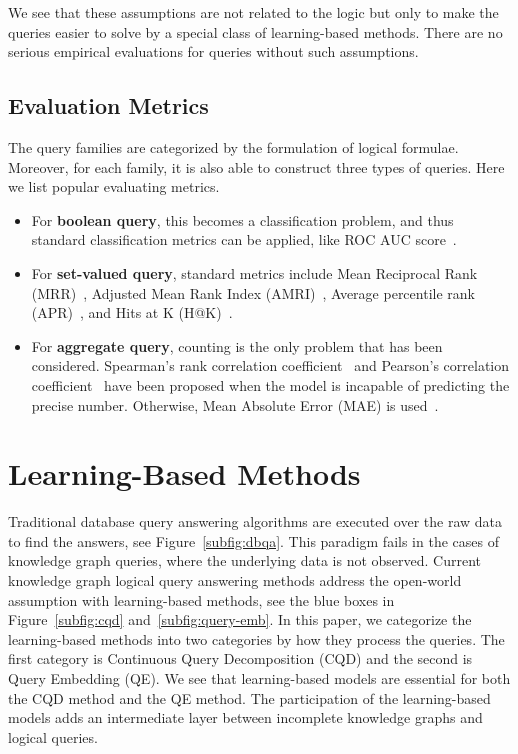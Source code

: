 \documentclass[11pt]{article}
\begin{document}
We see that these assumptions are not related to the logic but only to make the queries easier to solve by a special class of learning-based methods. There are no serious empirical evaluations for queries without such assumptions.

\subsection{Evaluation Metrics}
The query families are categorized by the formulation of logical formulae. Moreover, for each family, it is also able to construct three types of queries. Here we list popular evaluating metrics.
\begin{itemize}
\item For \textbf{boolean query}, this becomes a classification problem, and thus standard classification metrics can be applied, like ROC AUC score~\cite{Ren2020BetaEmbeddings, Hamilton2018EmbeddingLogical}.
\item For \textbf{set-valued query}, standard metrics include Mean Reciprocal Rank (MRR)~\cite{Ren2020Query2boxReasoning},  Adjusted Mean Rank Index (AMRI)~\cite{Alivanistos2022QueryEmbedding}, Average percentile rank (APR)~\cite{Hamilton2018EmbeddingLogical}, and Hits at K (H@K)~\cite{Ren2020Query2boxReasoning}.
\item For \textbf{aggregate query}, counting is the only problem that has been considered. Spearman's rank correlation coefficient~\cite{Ren2020BetaEmbeddings} and Pearson's correlation coefficient~\cite{Luus2021LogicEmbeddings} have been proposed when the model is incapable of predicting the precise number. Otherwise, Mean Absolute Error (MAE) is used~\cite{Luus2021LogicEmbeddings}.
\end{itemize}

\section{Learning-Based Methods}\label{sec:method}
Traditional database query answering algorithms are executed over the raw data to find the answers, see Figure~\ref{subfig:dbqa}. This paradigm fails in the cases of knowledge graph queries, where the underlying data is not observed.
Current knowledge graph logical query answering methods address the open-world assumption with learning-based methods, see the blue boxes in Figure~\ref{subfig:cqd} and~\ref{subfig:query-emb}.
In this paper, we categorize the learning-based methods into two categories by how they process the queries. The first category is Continuous Query Decomposition (CQD) and the second is Query Embedding (QE). We see that learning-based models are essential for both the CQD method and the QE method. The participation of the learning-based models adds an intermediate layer between incomplete knowledge graphs and logical queries.
\end{document}
